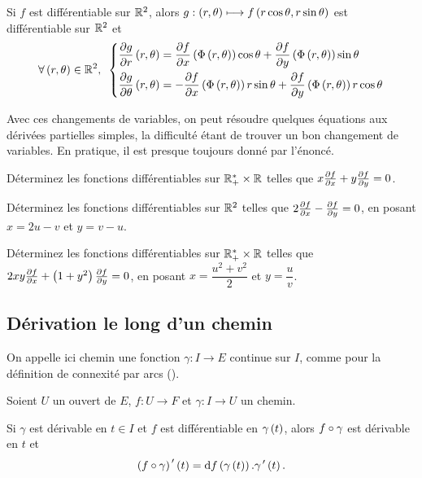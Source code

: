 \begin{ex}
Si \(f\) est différentiable sur \(\mathbb{R}^2\), alors \(g:\left(r,\theta\right)\longmapsto f\left(r\cos\theta,r\sin\theta\right)\) est différentiable sur \(\mathbb{R}^2\) et \[\quantifs{\forall\paren{r,\theta}\in\R^2}\begin{dcases}
\pdv{g}{r}\paren{r,\theta}=\pdv{f}{x}\paren{\Phi\paren{r,\theta}}\cos\theta+\pdv{f}{y}\paren{\Phi\paren{r,\theta}}\sin\theta \\
\pdv{g}{\theta}\paren{r,\theta}=-\pdv{f}{x}\paren{\Phi\paren{r,\theta}}r\sin\theta+\pdv{f}{y}\paren{\Phi\paren{r,\theta}}r\cos\theta
\end{dcases}\]

Avec ces changements de variables, on peut résoudre quelques équations aux dérivées partielles simples, la difficulté étant de trouver un bon changement de variables. En pratique, il est presque toujours donné par l'énoncé.
\end{ex}

\begin{exo}
Déterminez les fonctions différentiables sur \(\mathbb{R}_+^*\times\mathbb{R}\) telles que \(x\pdv{f}{x}+y\pdv{f}{y}=0\).
\end{exo}

\begin{exo}
Déterminez les fonctions différentiables sur \(\mathbb{R}^2\) telles que \(2\pdv{f}{x}-\pdv{f}{y}=0\), en posant \(x=2u-v\) et \(y=v-u\).
\end{exo}

\begin{exo}
Déterminez les fonctions différentiables sur \(\mathbb{R}_+^*\times\mathbb{R}\) telles que \(2xy\pdv{f}{x}+\left(1+y^2\right)\pdv{f}{y}=0\), en posant \(x=\dfrac{u^2+v^2}{2}\) et \(y=\dfrac{u}{v}\).
\end{exo}

\subsection{Dérivation le long d'un chemin}

On appelle ici chemin une fonction \(\gamma:I\to E\) continue sur \(I\), comme pour la définition de connexité par arcs (\cf {}).

\begin{prop}
Soient \(U\) un ouvert de \(E\), \(f:U\to F\) et \(\gamma:I\to U\) un chemin.

Si \(\gamma\) est dérivable en \(t\in I\) et \(f\) est différentiable en \(\gamma\left(t\right)\), alors \(f\circ\gamma\) est dérivable en \(t\) et \[\paren{f\rond\gamma}\prim\paren{t}=\odif{f}\paren{\gamma\paren{t}}.\gamma\prim\paren{t}.\]
\end{prop}

